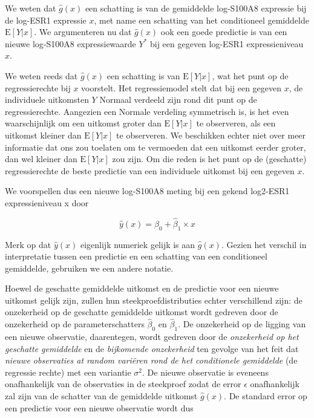 \documentclass[
  12pt,dutch,coursenotes]{book}
\theoremstyle{definition}
\theoremstyle{definition}
\theoremstyle{definition}
\theoremstyle{definition}
\theoremstyle{remark}
\begin{document}
We weten dat \(\hat{g}(x)\) een schatting is van de gemiddelde log-S100A8 expressie bij de log-ESR1 expressie \(x\), met name een schatting van het conditioneel gemiddelde \(\text{E}[Y\vert x]\). We argumenteren nu dat \(\hat{g}(x)\) ook een goede predictie is van een nieuwe log-S100A8 expressiewaarde \(Y^*\) bij een gegeven log-ESR1 expressieniveau \(x\).

We weten reeds dat \(\hat{g}(x)\) een schatting is van \(\text{E}[Y\vert x]\), wat het punt op de regressierechte bij \(x\) voorstelt. Het regressiemodel stelt dat bij een gegeven \(x\), de individuele uitkomsten \(Y\) Normaal verdeeld zijn rond dit punt op de regressierechte. Aangezien een Normale verdeling symmetrisch is, is het even waarschijnlijk om een uitkomst groter dan \(\text{E}[Y\vert x]\) te observeren, als een uitkomst kleiner dan \(\text{E}[Y\vert x]\) te observeren. We beschikken echter niet over meer informatie dat ons zou toelaten om te vermoeden dat een uitkomst eerder groter, dan wel kleiner dan \(\text{E}[Y\vert x]\) zou zijn. Om die reden is het punt op de (geschatte) regressierechte de beste predictie van een individuele uitkomst bij een gegeven \(x\).

We voorspellen dus een nieuwe log-S100A8 meting bij een gekend log2-ESR1 expressieniveau x door

\[
  \hat{y}(x)=\hat{\beta}_0+\hat{\beta}_1 \times x
\]

Merk op dat \(\hat{y}(x)\) eigenlijk numeriek gelijk is aan \(\hat{g}(x)\). Gezien het verschil in interpretatie tussen een predictie en een schatting van een conditioneel gemiddelde, gebruiken we een andere notatie.

Hoewel de geschatte gemiddelde uitkomst en de predictie voor een nieuwe uitkomst gelijk zijn, zullen hun steekproefdistributies echter verschillend zijn:
de onzekerheid op de geschatte gemiddelde uitkomst wordt gedreven door de onzekerheid op de parameterschatters \(\hat\beta_0\) en \(\hat\beta_1\). De onzekerheid op de ligging van een nieuwe observatie, daarentegen, wordt gedreven door de \emph{onzekerheid op het geschatte gemiddelde} en de \emph{bijkomende onzekerheid} ten gevolge van het feit dat \emph{nieuwe observaties at random variëren rond de het conditionele gemiddelde} (de regressie rechte) met een variantie \(\sigma^2\). De nieuwe observatie is eveneens onafhankelijk van de observaties in de steekproef zodat de error \(\epsilon\) onafhankelijk zal zijn van de schatter van de gemiddelde uitkomst \(\hat{g}(x)\). De standard error op een predictie voor een nieuwe observatie wordt dus
\end{document}
